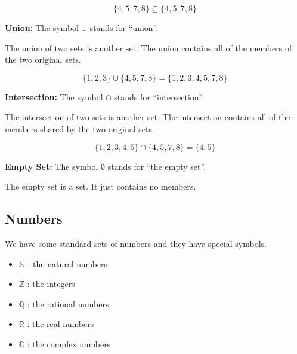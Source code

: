 \documentclass{ximera}
\begin{document}
\[
\{ 4, 5, 7, 8 \} \subseteq \{ 4, 5, 7, 8 \}
\]









\textbf{\textcolor{blue!55!black}{Union:}}  The symbol $\cup$ stands for ``union''.


The union of two sets is another set.  The union contains all of the members of the two original sets.

\[
\{ 1, 2, 3 \} \cup \{ 4, 5, 7, 8 \} = \{ 1, 2, 3, 4, 5, 7, 8 \}
\]








\textbf{\textcolor{blue!55!black}{Intersection:}}  The symbol $\cap$ stands for ``intersection''.

The intersection of two sets is another set.  The intersection contains all of the members shared by the two original sets.

\[
\{ 1, 2, 3, 4, 5 \} \cap \{ 4, 5, 7, 8 \} = \{ 4, 5 \}
\]








\textbf{\textcolor{blue!55!black}{Empty Set:}}  The symbol $\emptyset$ stands for ``the empty set''.

The empty set is a set.  It just contains no members.














\subsection*{Numbers}

We have some standard sets of numbers and they have special symbols. \\



\begin{itemize}

\item $\mathbb{N}$ : the natural numbers
\item $\mathbb{Z}$ : the integers
\item $\mathbb{Q}$ : the rational numbers
\item $\mathbb{R}$ : the real numbers
\item $\mathbb{C}$ : the complex numbers
\end{itemize}
\end{document}
